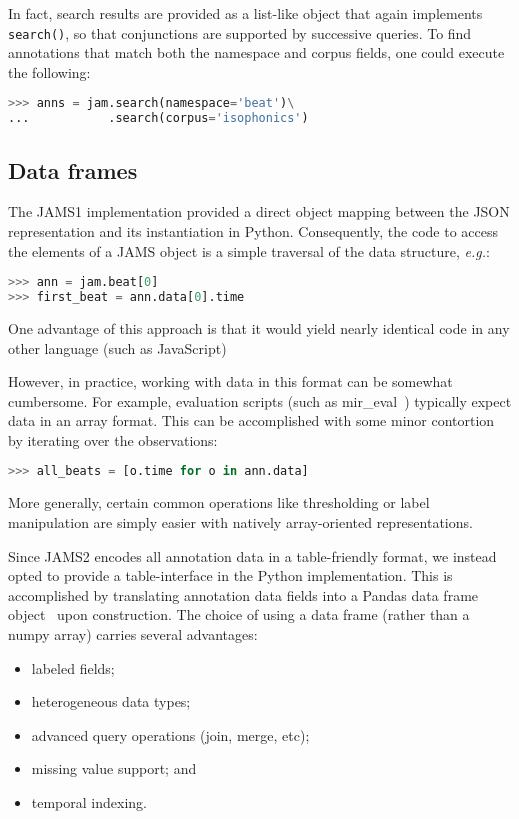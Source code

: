 \documentclass{article}
\begin{document}
In fact, search results are provided as a list-like object that again implements 
\texttt{search()}, so that conjunctions are supported by successive queries.
To find annotations that match both the namespace and corpus fields, one could execute 
the following:
\begin{lstlisting}[language=python]
>>> anns = jam.search(namespace='beat')\
...           .search(corpus='isophonics')
\end{lstlisting}


\subsection{Data frames}\label{sec:imp:dataframe}
The JAMS1 implementation provided a direct object mapping between the JSON representation
and its instantiation in Python.
Consequently, the code to access the elements of a JAMS object is a simple traversal of the
data structure, \emph{e.g.}:
\begin{lstlisting}[language=python]
>>> ann = jam.beat[0]
>>> first_beat = ann.data[0].time
\end{lstlisting}
One advantage of this approach is that it would yield nearly identical code in any other
language (such as JavaScript)

However, in practice, working with data in this format can be somewhat cumbersome.
For example, evaluation scripts (such as mir\_eval~\cite{raffel2014}) typically expect
data in an array format.  This can be accomplished with some minor contortion by
iterating over the observations:
\begin{lstlisting}[language=python]
>>> all_beats = [o.time for o in ann.data]
\end{lstlisting}
More generally, certain common operations like thresholding or
label manipulation are simply easier with natively array-oriented representations.

Since JAMS2 encodes all annotation data in a table-friendly format, we instead opted to
provide a table-interface in the Python implementation.  This is accomplished by
translating annotation data fields into a Pandas data frame
object~\cite{mckinney-proc-scipy-2010} upon construction.
The choice of using a data frame (rather than a numpy array) carries several advantages:
\begin{itemize}
    \setlength\itemsep{0em}
    \item labeled fields;
    \item heterogeneous data types;
    \item advanced query operations (join, merge, etc);
    \item missing value support; and
    \item temporal indexing.
\end{itemize}
\end{document}
